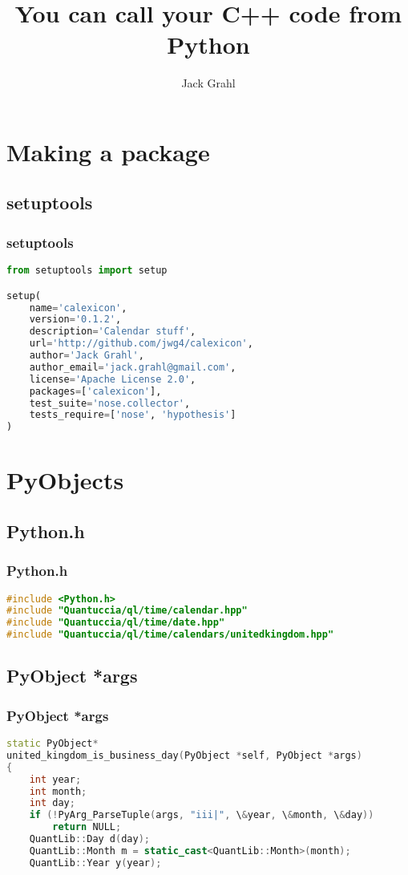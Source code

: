 \documentclass{beamer}
\title{You can call your C++ code from Python}
\author{Jack Grahl}
\institute{PrismFP Analytics}
\begin{document}

	\section{Making a package}

	\subsection{setuptools}
	\begin{frame}[fragile]
		\frametitle{setuptools}
		\begin{lstlisting}[language=Python]
from setuptools import setup

setup(
    name='calexicon',
    version='0.1.2',
    description='Calendar stuff',
    url='http://github.com/jwg4/calexicon',
    author='Jack Grahl',
    author_email='jack.grahl@gmail.com',
    license='Apache License 2.0',
    packages=['calexicon'],
    test_suite='nose.collector',
    tests_require=['nose', 'hypothesis']
)
		\end{lstlisting}
	\end{frame}

	\section{PyObjects}

	\subsection{Python.h}
	\begin{frame}[fragile]
		\frametitle{Python.h}
		\begin{lstlisting}[language=C++]
#include <Python.h>
#include "Quantuccia/ql/time/calendar.hpp"
#include "Quantuccia/ql/time/date.hpp"
#include "Quantuccia/ql/time/calendars/unitedkingdom.hpp"
		\end{lstlisting}
	\end{frame}

	\subsection{PyObject *args}
	\begin{frame}[fragile]
		\frametitle{PyObject *args}
		\begin{lstlisting}[language=C++]
   static PyObject*
united_kingdom_is_business_day(PyObject *self, PyObject *args)
{
    int year;
    int month;
    int day;
    if (!PyArg_ParseTuple(args, "iii|", \&year, \&month, \&day))
        return NULL;
    QuantLib::Day d(day);
    QuantLib::Month m = static_cast<QuantLib::Month>(month);
    QuantLib::Year y(year);
		\end{lstlisting}
	\end{frame}
\end{document}
